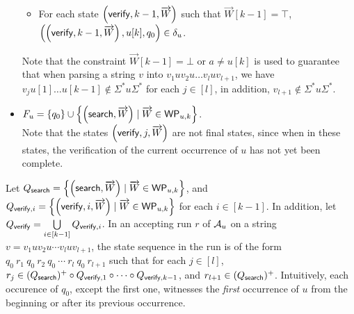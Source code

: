 \begin{definition}
\begin{itemize}
\begin{itemize}
		\item For each state $\left(\mathsf{verify}, k-1, \overrightarrow{W} \right)$ such that $\overrightarrow{W}[k-1]=\top$, $\left(\left(\mathsf{verify}, k-1, \overrightarrow{W} \right), u[k], q_0\right) \in \delta_u$.
	\end{itemize}
Note that the constraint $\overrightarrow{W}[k-1] = \bot$ or $a \neq u[k]$ is used to guarantee that when parsing a string $v$ into $v_1 u v_2 u \dots v_{l} u v_{l+1}$, we have $v_j u[1] \dots u[k-1] \not \in \Sigma^\ast u \Sigma^\ast$ for each $j \in [l]$, in addition, $v_{l+1} \not \in  \Sigma^\ast u \Sigma^\ast$.
	\item $F_u= \left\{q_0 \right\} \cup \left\{\left(\mathsf{search}, \overrightarrow{W} \right) \mid \overrightarrow{W} \in \mathsf{WP}_{u, k} \right\} $. \\
	Note that the states $\left(\mathsf{verify}, j, \overrightarrow{W} \right)$ are not final states, since when in these states, the verification of the current occurrence of $u$ has not yet been complete.
\end{itemize}
\end{definition}

Let $Q_{\mathsf{search}}  = \left\{ \left(\mathsf{search}, \overrightarrow{W} \right) \mid \overrightarrow{W} \in \mathsf{WP}_{u,k} \right\}$,  and $Q_{\mathsf{verify}, i} = \left\{ \left(\mathsf{verify}, i, \overrightarrow{W} \right) \mid \overrightarrow{W} \in \mathsf{WP}_{u,k} \right\}$ for each $i \in [k-1]$. In addition, let $Q_{\mathsf{verify}} = \bigcup \limits_{i \in [k-1]} Q_{\mathsf{verify},i}$.
In an accepting run $r$ of $\mathcal{A}_u$ on a string $v = v_1 u v_2 u \cdots v_l u v_{l+1}$, the state sequence in the run is of the form 
$q_0\ r_1\ q_0\ r_2\ q_0\ \cdots\ r_l\ q_0\ r_{l+1}$
such that  for each $j \in [l]$, $r_j \in (Q_{\mathsf{search}})^+ \circ Q_{\mathsf{verify}, 1} \circ \cdots  \circ Q_{\mathsf{verify}, k-1}$, and $r_{l+1} \in (Q_{\mathsf{search}})^+$. Intuitively, each occurence of $q_0$, except the first one, witnesses the \emph{first} occurrence of $u$ from the beginning or after its previous occurrence.


